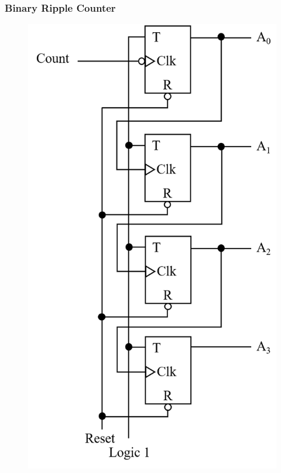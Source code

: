 \documentclass[a4paper]{article}
\begin{document}
\subsubsection{Binary Ripple Counter}
\begin{minipage}[t]{0.35\textwidth}
\begin{figure}[H]
    \centering
    \includegraphics[width=\textwidth]{binary-ripple-counter.png}
\end{figure}
\end{minipage}
\end{document}
